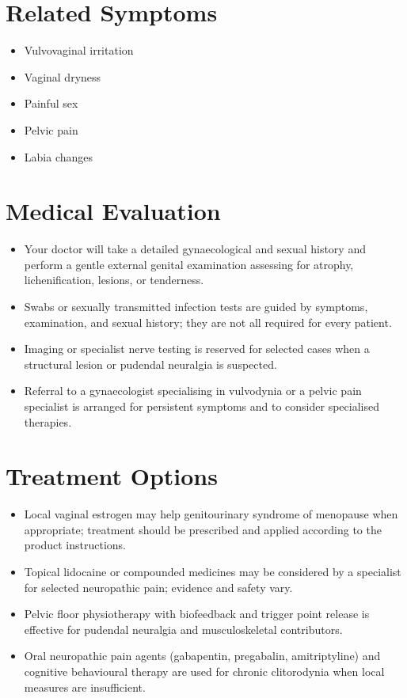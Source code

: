 \section*{Related Symptoms}
\begin{itemize}
  \item Vulvovaginal irritation
  \item Vaginal dryness
  \item Painful sex
  \item Pelvic pain
  \item Labia changes
\end{itemize}


\section*{Medical Evaluation}
\begin{itemize}
  \item Your doctor will take a detailed gynaecological and sexual history and perform a gentle external genital examination assessing for atrophy, lichenification, lesions, or tenderness.
  \item Swabs or sexually transmitted infection tests are guided by symptoms, examination, and sexual history; they are not all required for every patient.
  \item Imaging or specialist nerve testing is reserved for selected cases when a structural lesion or pudendal neuralgia is suspected.
  \item Referral to a gynaecologist specialising in vulvodynia or a pelvic pain specialist is arranged for persistent symptoms and to consider specialised therapies.
\end{itemize}

\section*{Treatment Options}
\begin{itemize}
  \item Local vaginal estrogen may help genitourinary syndrome of menopause when appropriate; treatment should be prescribed and applied according to the product instructions.
  \item Topical lidocaine or compounded medicines may be considered by a specialist for selected neuropathic pain; evidence and safety vary.
  \item Pelvic floor physiotherapy with biofeedback and trigger point release is effective for pudendal neuralgia and musculoskeletal contributors.
  \item Oral neuropathic pain agents (gabapentin, pregabalin, amitriptyline) and cognitive behavioural therapy are used for chronic clitorodynia when local measures are insufficient.
\end{itemize}

